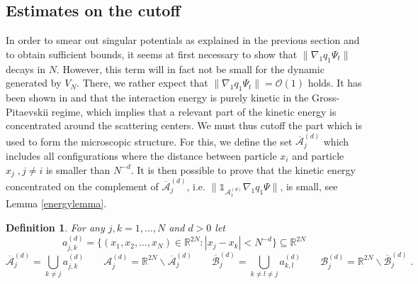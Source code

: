 \documentclass[11pt, english, american]{article}
\newcommand{\be}{\begin{equation}}
\newcommand{\ee}{\end{equation}}
\newtheorem{definition}[theorem] {Definition}
\begin{document}
\subsection{Estimates on the cutoff}
In order to smear out singular potentials  as explained in the previous section and to obtain sufficient bounds, it seems at first necessary to show that $\|\nabla_1 q_1\Psi_t\|$  decays in $N$. However,
 this term will in fact not be small for the dynamic generated by $V_N$. There, we rather expect that $\|\nabla_1q_1\Psi_t\| = \mathcal{O}(1)$ holds.
It has been shown in \cite{cherny} and \cite{lieb100bec}  that the interaction energy is purely kinetic in the Gross-Pitaevskii regime, which 
implies that a relevant part of the kinetic energy is concentrated around the scattering centers. 
We must thus cutoff the part which is used to form the microscopic structure.
For this, we define the set $\overline{\mathcal{A}}^{(d)}_j$ which includes all configurations where the distance between particle $x_i$ and particle $x_j \;,j \neq i$ is smaller than $N^ {-d}$. 
It is then possible to prove that the kinetic energy concentrated on the complement of $\overline{\mathcal{A}}_j^{(d)}$, i.e. $\|\mathds{1}_{\mathcal{A}^{(d)}_1}\nabla_1q_1\Psi\|$, is small, see Lemma \ref{energylemma}.

\begin{definition}
\label{hdetail} 
For any $j,k=1, \dots,N$ and $ d>0$ 
let
 \be
 \label{defkleins}a^{(d)}_{j,k}=\{(x_1,x_2,\ldots,x_N)\in
\mathbb{R}^{2N}: |x_j-x_k|<N^{-d}\}
\subseteq \mathbb{R}^{2N}
\ee
$$\overline{\mathcal{A}}^{(d)}_j=\bigcup_{k\neq j}a^{(d)}_{j,k}\;\;\;\;\;\;\;\mathcal{A}^{(d)}_j=\mathbb{R}^{2N}\backslash \overline{\mathcal{A}}_j^{(d)}
\;\;\;\;\;\;\;\overline{\mathcal{B}}^{(d)}_{j}=\bigcup_{k\neq l\neq j}a^{(d)}_{k,l}\;\;\;\;\;\;\;\mathcal{B}^{(d)}_{j}=\mathbb{R}^{2N}\backslash
\overline{\mathcal{B}}^{(d)}_{j}\;.$$
\end{definition}
\end{document}
